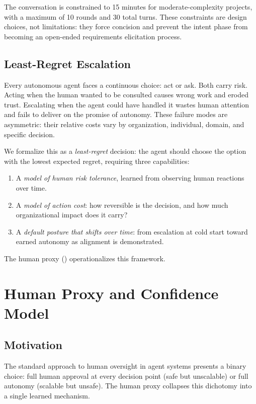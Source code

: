 \documentclass[11pt,a4paper]{article}
\begin{document}
The conversation is constrained to 15 minutes for moderate-complexity
projects, with a maximum of 10 rounds and 30 total turns. These
constraints are design choices, not limitations: they force concision
and prevent the intent phase from becoming an open-ended requirements
elicitation process.

\subsection{Least-Regret Escalation}

Every autonomous agent faces a continuous choice: act or ask. Both
carry risk. Acting when the human wanted to be consulted causes wrong
work and eroded trust. Escalating when the agent could have handled
it wastes human attention and fails to deliver on the promise of
autonomy. These failure modes are asymmetric: their relative costs
vary by organization, individual, domain, and specific decision.

We formalize this as a \emph{least-regret} decision: the agent should
choose the option with the lowest expected regret, requiring three
capabilities:

\begin{enumerate}
    \item A \emph{model of human risk tolerance}, learned from
    observing human reactions over time.
    \item A \emph{model of action cost}: how reversible is the
    decision, and how much organizational impact does it carry?
    \item A \emph{default posture that shifts over time}: from
    escalation at cold start toward earned autonomy as alignment
    is demonstrated.
\end{enumerate}

The human proxy () operationalizes this framework.

\section{Human Proxy and Confidence Model}
\label{sec:proxy}

\subsection{Motivation}

The standard approach to human oversight in agent systems presents a
binary choice: full human approval at every decision point (safe but
unscalable) or full autonomy (scalable but unsafe). The human proxy
collapses this dichotomy into a single learned mechanism.
\end{document}
